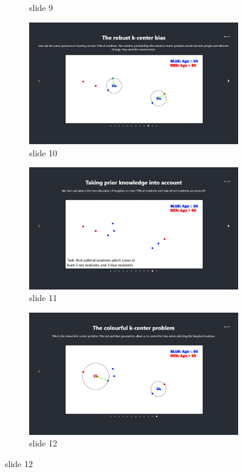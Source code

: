 \begin{figure}[H]
\begin{subfigure}{0.5\textwidth}
        \caption{slide 9}
    \end{subfigure}
    \begin{subfigure}{0.5\textwidth}
        \centering
        \includegraphics[width=\textwidth]{images/learn_09-base.png}
        \caption{slide 10}
    \end{subfigure}
    \begin{subfigure}{0.5\textwidth}
        \centering
        \includegraphics[width=\textwidth]{images/learn_10-base.png}
        \caption{slide 11}
    \end{subfigure}
    \begin{subfigure}{0.5\textwidth}
        \centering
        \includegraphics[width=\textwidth]{images/learn_11-base.png}
        \caption{slide 12}
    \end{subfigure}
\end{figure}